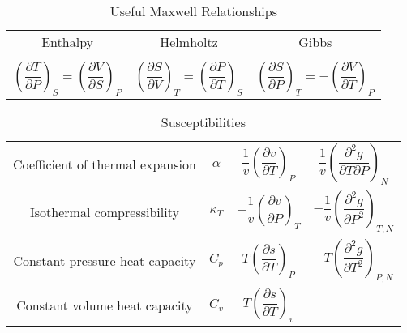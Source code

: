 \documentclass[11pt]{article}
\begin{document}
\begin{table}
  \begin{center}
  \caption{\label{Maxwell}Useful Maxwell Relationships}
  \begin{tabular}{ccc}
\hline
Enthalpy   & Helmholtz & Gibbs \\
 & & \\
$ \left ( \dfrac{\partial T}{\partial P}\right )_S =  \left ( \dfrac{\partial V}{\partial
    S}\right )_P  $ &
$ \left ( \dfrac{\partial S}{\partial V}\right )_T =  \left ( \dfrac{\partial P}{\partial
    T}\right )_S  $ &
$ \left ( \dfrac{\partial S}{\partial P}\right )_T =  -\left ( \dfrac{\partial V}{\partial
    T}\right )_P  $ \\
\hline
  \end{tabular}
  \end{center}
\end{table}
\begin{table}
  \begin{center}
  \caption{\label{susceptibilities}Susceptibilities}
  \begin{tabular}{cccc}
\hline
    Coefficient of thermal expansion & $\alpha$ &  $\dfrac{1}{v} \left (
      \dfrac{\partial v}{\partial T} \right )_P$  & $\dfrac{1}{v} \left (
      \dfrac{\partial^2 g}{\partial T \partial P} \right )_N$\\
  Isothermal compressibility   & $\kappa_T$  & $-\dfrac{1}{v} \left (
      \dfrac{\partial v}{\partial P} \right )_T$ & $-\dfrac{1}{v} \left (
      \dfrac{\partial^2 g}{\partial P^2} \right )_{T,N}$\\
  Constant  pressure heat capacity & $C_p$ & $ T \left ( \dfrac{\partial
      s}{\partial T}\right )_P $ & $-T \left (
      \dfrac{\partial^2 g}{\partial T^2} \right )_{P,N}$\\
  Constant  volume heat capacity & $C_v$ & $ T \left ( \dfrac{\partial
      s}{\partial T}\right )_v $ & \\
\hline
  \end{tabular}
  \end{center}
\end{table}
\end{document}
